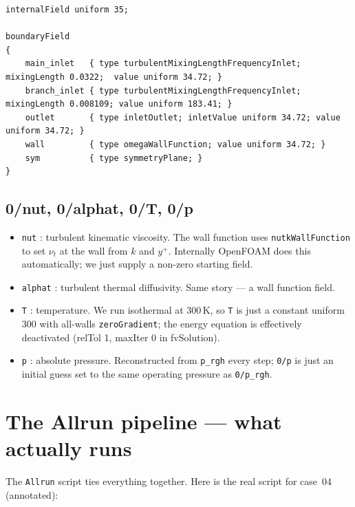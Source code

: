 \documentclass[11pt,a4paper]{article}
\begin{document}
\begin{lstlisting}[style=foamstyle,caption={\texttt{0/omega} (full)}]
internalField uniform 35;

boundaryField
{
    main_inlet   { type turbulentMixingLengthFrequencyInlet; mixingLength 0.0322;  value uniform 34.72; }
    branch_inlet { type turbulentMixingLengthFrequencyInlet; mixingLength 0.008109; value uniform 183.41; }
    outlet       { type inletOutlet; inletValue uniform 34.72; value uniform 34.72; }
    wall         { type omegaWallFunction; value uniform 34.72; }
    sym          { type symmetryPlane; }
}
\end{lstlisting}

\subsection{0/nut, 0/alphat, 0/T, 0/p}

\begin{itemize}[leftmargin=1.5em,topsep=2pt]
    \item \texttt{nut} : turbulent kinematic viscosity. The wall
    function uses \texttt{nutkWallFunction} to set $\nu_t$ at the
    wall from $k$ and $y^+$. Internally OpenFOAM does this
    automatically; we just supply a non-zero starting field.
    \item \texttt{alphat} : turbulent thermal diffusivity. Same
    story --- a wall function field.
    \item \texttt{T} : temperature. We run isothermal at 300\,K, so
    \texttt{T} is just a constant uniform 300 with all-walls
    \texttt{zeroGradient}; the energy equation is effectively
    deactivated (relTol 1, maxIter 0 in fvSolution).
    \item \texttt{p} : absolute pressure. Reconstructed from
    \texttt{p\_rgh} every step; \texttt{0/p} is just an initial guess
    set to the same operating pressure as \texttt{0/p\_rgh}.
\end{itemize}

\clearpage
\section{The Allrun pipeline --- what actually runs}

The \texttt{Allrun} script ties everything together. Here is the
real script for case~04 (annotated):
\end{document}
